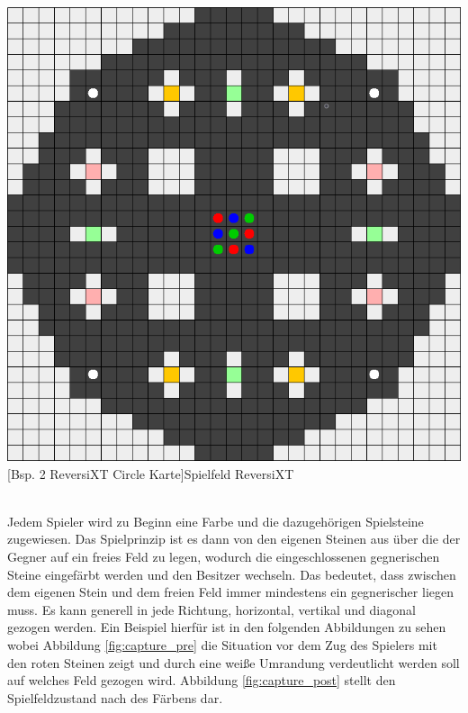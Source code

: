 \documentclass[12pt,a4paper,bibliography=totocnumbered,listof=totocnumbered]{article}
\begin{document}
\vspace{1em}
\begin{minipage}{\linewidth}
	\centering
	\includegraphics[width=0.7\linewidth]{pics/reversixt_circle_map.png}
	[Bsp. 2 ReversiXT Circle Karte]{Spielfeld ReversiXT}
	\label{fig:reversixt_circle_map}
\end{minipage}
\\

Jedem Spieler wird zu Beginn eine Farbe und die dazugehörigen Spielsteine zugewiesen. Das Spielprinzip ist es dann von den eigenen Steinen aus über die der Gegner auf ein freies Feld zu legen, wodurch die eingeschlossenen gegnerischen Steine eingefärbt werden und den Besitzer wechseln. Das bedeutet, dass zwischen dem eigenen Stein und dem freien Feld immer mindestens ein gegnerischer liegen muss. Es kann generell in jede Richtung, horizontal, vertikal und diagonal gezogen werden. Ein Beispiel hierfür ist in den folgenden Abbildungen zu sehen wobei Abbildung \ref{fig:capture_pre} die Situation vor dem Zug des Spielers mit den roten Steinen zeigt und durch eine weiße Umrandung verdeutlicht werden soll auf welches Feld gezogen wird. Abbildung \ref{fig:capture_post} stellt den Spielfeldzustand nach des Färbens dar.
\end{document}
